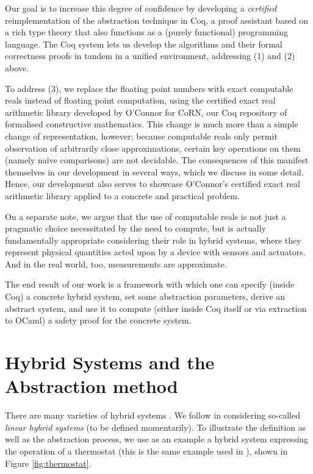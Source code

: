 \documentclass[runningheads]{llncs}
\begin{document}
Our goal is to increase this degree of confidence by developing a \emph{certified} reimplementation of the abstraction technique in Coq, a proof assistant based on a rich type theory that also functions as a (purely functional) programming language. The Coq system lets us develop the algorithms and their formal correctness proofs in tandem in a unified environment, addressing (1) and (2) above.

To address (3), we replace the floating point numbers with exact computable reals instead of floating point computation, using the certified exact real arithmetic library developed by O'Connor \cite{oconnor} for CoRN, our Coq repository of formalised constructive mathematics. \cite{corn} This change is much more than a simple change of representation, however; because computable reals only permit observation of arbitrarily close approximations, certain key operations on them (namely naive comparisons) are not decidable. The consequences of this manifest themselves in our development in several ways, which we discuss in some detail. Hence, our development also serves to showcase O'Connor's certified exact real arithmetic library applied to a concrete and practical problem.

On a separate note, we argue that the use of computable reals is not just a pragmatic choice necessitated by the need to compute, but is actually fundamentally appropriate considering their role in hybrid systems, where they represent physical quantities acted upon by a device with sensors and actuators. And in the real world, too, measurements are approximate.

The end result of our work is a framework with which one can specify (inside Coq) a concrete hybrid system, set some abstraction parameters, derive an abstract system, and use it to compute (either inside Coq itself or via extraction to OCaml) a safety proof for the concrete system.

\section{Hybrid Systems and the Abstraction method}
\label{sec:hybsys}
There are many varieties of hybrid systems \cite{henziger,lynchvaandrager}. We follow \cite{alur} in considering so-called \emph{linear hybrid systems} (to be defined momentarily). To illustrate the definition as well as the abstraction process, we use as an example a hybrid system expressing the operation of a thermostat (this is the same example used in \cite{alur}), shown in Figure \ref{fig:thermostat}.
\end{document}

